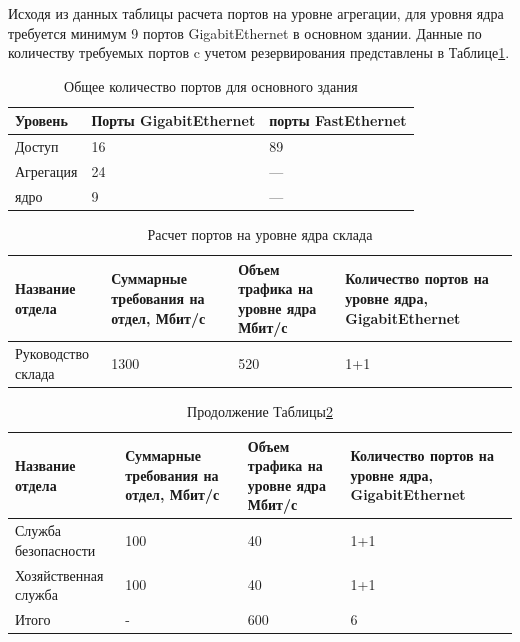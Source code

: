 Исходя из данных таблицы расчета портов на уровне агрегации, для уровня ядра требуется минимум 9 портов GigabitEthernet в основном здании. Данные по количеству требуемых портов c учетом резервирования представлены в Таблице\;\ref{table:all_ports_oz}.

\begin{table}[H]
    \centering
    \caption{Общее количество портов для основного здания\label{table:all_ports_oz}}
    \small
    \begin{tabularx}{\textwidth}{|X|X|X|}
        \hline
		Уровень		& Порты GigabitEthernet	&	порты FastEthernet	\\
        \hline	
		Доступ		& 16       				&  	89					\\
		\hline
		Агрегация	& 24					& 	---					\\
		\hline
		ядро		& 9         			&  	---					\\
        \hline
    \end{tabularx}
\end{table}

\begin{table}[H]
    \centering
	\caption{Расчет портов на уровне ядра склада\label{table:agr_ports_sk}}
    \small
	\begin{tabularx}{\textwidth}{|X|X|X|X|}
        \hline
		Название отдела&Суммарные требования на отдел, Мбит/с & Объем трафика на уровне ядра Мбит/с &Количество портов на уровне ядра, GigabitEthernet \\
        \hline
		Руководство склада		         &	1300  & 520 & 1+1	\\
    \end{tabularx}
\end{table}

\begin{table}[H]
    \centering
	\caption{Продолжение Таблицы\;\ref{table:agr_ports_sk}}
    \small
	\begin{tabularx}{\textwidth}{|X|X|X|X|}
        \hline
		Название отдела&Суммарные требования на отдел, Мбит/с & Объем трафика на уровне ядра Мбит/с &Количество портов на уровне ядра, GigabitEthernet \\
        \hline
		Служба безопасности				&	100	  & 40 & 1+1 \\
		\hline
		Хозяйственная служба			&	100   & 40 & 1+1 \\
        \hline
		Итого							& -		 & 600 & 6 \\
		\hline
    \end{tabularx}
\end{table}

